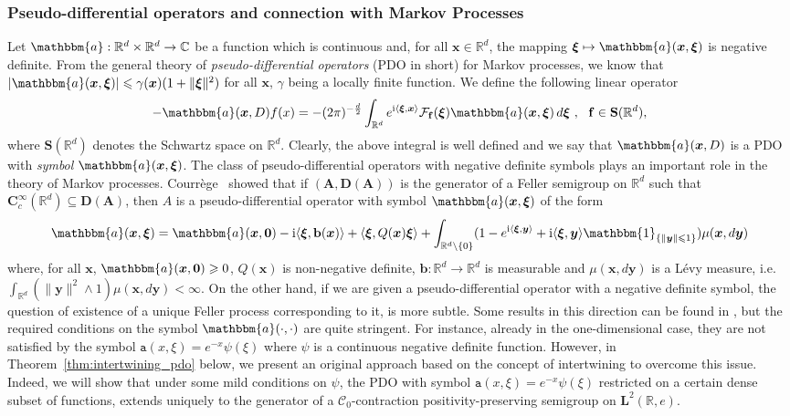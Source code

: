 \documentclass[12pt]{amsart}
\newcommand{\hlabel}{\phantomsection\label}
\numberwithin{equation}{section}
\newcommand{\bb}{\mathbb}
\newcommand{\cc}{\mathcal}
\renewcommand{\ge}{\geqslant}
\renewcommand{\le}{\leqslant}
\newcommand{\bbm}{\mathbbm}
\newcommand{\ttt}{\mathtt}
\newcommand{\bmrm}[2][2]{\mathbf{#2}^{#1}}
\newcommand{\C}{\mathbf{C}}
\newcommand{\D}{\mathbf{D}}
\renewcommand{\SS}{\mathbf{S}}
\newcommand{\f}{\mathbf{f}}
\theoremstyle{definition}
\theoremstyle{assump}
\theoremstyle{remark}
\begin{document}
\subsubsection{Pseudo-differential operators and connection with Markov Processes}\hlabel{ss:lamperti}
Let $\bbm{a}:\bb{R}^d\times\bb{R}^d\to\bb{C}$ be a function which is continuous and, for all $\bm{x}\in \bb{R}^d$, the mapping $\bm{\xi} \mapsto \bbm{a}(\bm{x},\bm{\xi})$ is negative definite. From the general theory of \emph{pseudo-differential operators} (PDO in short) for Markov processes, we know that $|\bbm{a}(\bm{x},\bm{\xi})|\le\gamma(\bm{x})(1+\|\bm{\xi}\|^2)$ for all $\bm{x}$, $\gamma$ being a locally finite function. We define the following linear operator
\begin{equation*}
    -\bbm{a}(\bm{x},D)f(x)=-(2\pi)^{-\frac{d}{2}}\int_{\bb{R}^d}e^{\mathrm{i}\langle\bm{\xi},\bm{x}\rangle}\mathcal{F}_{\f}(\bm{\xi})\bbm{a}(\bm{x},\bm{\xi})\,d\bm{\xi}~, \  \  \f\in\SS(\bb{R}^d),
\end{equation*}
where $\SS(\bb{R}^d)$ denotes the Schwartz space on $\bb{R}^d$. Clearly, the above integral is well defined and we say that $\bbm{a}(\bm{x},D)$ is a PDO with  \emph{symbol} $\bbm{a}(\bm{x},\bm{\xi})$. The class of pseudo-differential operators with negative definite symbols plays an important role in the theory of Markov processes. Courr\`ege~\cite{courrege1966} showed that if $(\bm{A},\D(\bm{A}))$ is the generator of a Feller semigroup on $\bb{R}^d$ such that $\C^\infty_c(\bb{R}^d)\subseteq\D(\bm{A})$, then $A$ is a pseudo-differential operator with symbol $\bbm{a}(\bm{x},\bm{\xi})$ of the form
$$\bbm{a}(\bm{x},\bm{\xi})=\bbm{a}(\bm{x},\bm{0})-{\rm{i}}\langle\bm{\xi},\mathbf{b}(\bm{x})\rangle+\langle\bm{\xi}, Q(\bm{x})\bm{\xi}\rangle+\int_{\bb{R}^d\setminus\{0\}}(1-e^{{\rm{i}}\langle\bm{\xi},\bm{y}\rangle}+{\rm{i}}\langle\bm{\xi},\bm{y}\rangle\bbm{1}_{\{\|\bm{y}\|\le 1\}})\mu(\bm{x},d\bm{y})$$
where,  for all $\bm{x}$, $\bbm{a}(\bm{x},\bm{0})\ge 0$, $Q(\bm{x})$ is non-negative definite, $\mathbf{b}:\bb{R}^d\to\bb{R}^d$ is measurable and  $\mu(\bm{x},d\bm{y})$ is a L\'evy measure, i.e.~ $\int_{\bb{R}^d}(\|\bm{y}\|^2\wedge 1)\mu(\bm{x},d\bm{y})<\infty$.
On the other hand, if we are given a pseudo-differential operator with a negative definite symbol, the question of existence of a unique Feller process corresponding to it, is more subtle. Some results in this direction can be found in \cite[Theorem 5.7]{hoh1998pseudo}, but the required conditions on the symbol $\bbm{a}(\cdot,\cdot)$ are quite stringent. For instance, already in the one-dimensional case, they are not satisfied by the symbol $\ttt{a}(x,\xi)=e^{-x}\psi(\xi)$ where $\psi$ is a continuous negative definite function. However, in Theorem~\ref{thm:intertwining_pdo} below, we present an original approach based on the concept of  intertwining to overcome this issue. Indeed, we will show that under some mild conditions on $\psi$, the PDO with symbol $\ttt{a}(x,\xi)=e^{-x}\psi(\xi)$ restricted on a certain dense subset of functions, extends uniquely to the generator of a $\cc{C}_0$-contraction positivity-preserving semigroup on $\bmrm{L}(\bb{R},e)$.
\end{document}
